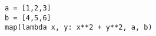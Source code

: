 \documentclass[12pt]{article}
\begin{document}
\begin{verbatim}
a = [1,2,3]
b = [4,5,6]
map(lambda x, y: x**2 + y**2, a, b)
\end{verbatim}
\end{document}
